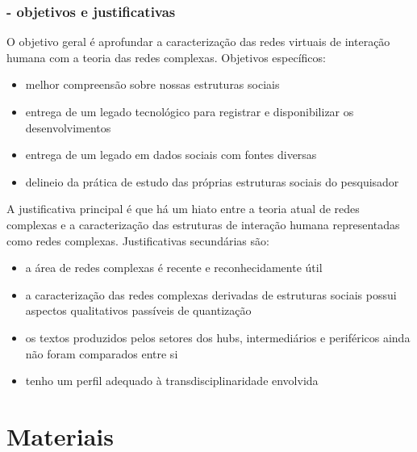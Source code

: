 \documentclass[10pt]{beamer}
\begin{document}
\begin{frame}
\frametitle{- objetivos e justificativas}
O objetivo geral é aprofundar a caracterização das redes virtuais de interação humana
com a teoria das redes complexas.
Objetivos específicos:
\begin{itemize}
	\item melhor compreensão sobre nossas estruturas sociais
	\item entrega de um legado tecnológico para registrar e disponibilizar os desenvolvimentos
	\item entrega de um legado em dados sociais com fontes diversas
	\item delineio da prática de estudo das próprias estruturas sociais do pesquisador
\end{itemize}

\vspace{.5cm}

A justificativa principal é que há um hiato entre a teoria atual de redes complexas
e a caracterização das estruturas de interação humana representadas como redes complexas.
Justificativas secundárias são:
\begin{itemize}
	\item a área de redes complexas é recente e reconhecidamente útil
	\item a caracterização das redes complexas derivadas de estruturas sociais possui aspectos qualitativos passíveis de quantização
	\item os textos produzidos pelos setores dos hubs, intermediários e periféricos ainda não foram comparados entre si
	\item tenho um perfil adequado à transdisciplinaridade envolvida
\end{itemize}

\end{frame}



\section{Materiais}
\end{document}
